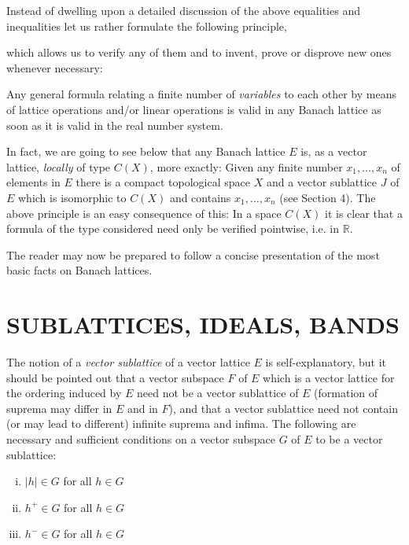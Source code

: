 Instead of dwelling upon a detailed discussion of the above equalities and inequalities let us rather formulate the following principle,

\pagebreak

which allows us to verify any of them and to invent, prove or disprove new ones whenever necessary:

Any general formula relating a finite number of \emph{variables} to each other by means of lattice operations and/or linear operations is valid in any Banach lattice as soon as it is valid in the real number system.

In fact, we are going to see below that any Banach lattice $ E $ is, as a vector lattice, \emph{locally} of type $ C(X) $, more exactly:
Given any finite number $ x_{1},\ldots,x_{n} $ of elements in $ E $ there is a compact topological space $ X $ and a vector sublattice $ J $ of $ E $ which is isomorphic to $ C(X) $ and contains $ x_{1},\ldots,x_{n} $ (see Section 4).
The above principle is an easy consequence of this:
In a space $ C(X) $ it is clear that a formula of the type considered need only be verified pointwise, i.e. in $ \mathbb{R} $.

The reader may now be prepared to follow a concise presentation of the most basic facts on Banach lattices.

\section{SUBLATTICES, IDEALS, BANDS}\label{sec:c1-1}

The notion of a \emph{vector sublattice} of a vector lattice $ E $ is self-explanatory, but it should be pointed out that a vector subspace $ F $ of $ E $ which is a vector lattice for the ordering induced by $ E $ need not be a vector sublattice of $ E $ (formation of suprema may differ in $ E $ and in $ F $), and that a vector sublattice need not contain (or may lead to different) infinite suprema and infima.
The following are necessary and sufficient conditions on a vector subspace $ G $ of $ E $ to be a vector sublattice:

\begin{enumerate}[(i)]
\item $ |h| \in G $ for all $ h \in G $
\item $ h^{+} \in G $ for all $ h \in G $
\item $ h^{-} \in G $ for all $ h \in G $
\end{enumerate}

